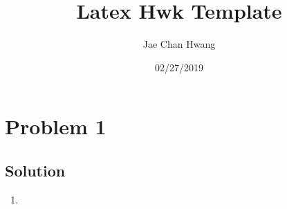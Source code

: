\documentclass[12pt]{article}
\title{Latex Hwk Template}
\author{Jae Chan Hwang}
\date{02/27/2019}
\begin{document}
\maketitle

\section{Problem 1}
\subsection*{Solution}

\begin{framed}
	\begin{enumerate}[label=(\alph*)]
		\item
	\end{enumerate}
\end{framed}
\begin{lstlisting}
\end{lstlisting}
\end{document}

